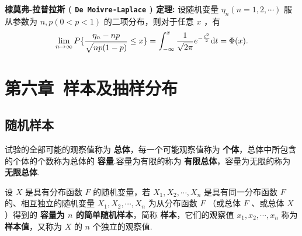 \documentclass[UTF8,10pt]{ctexart}
\begin{document}
	
	\textbf{棣莫弗-拉普拉斯 ( \texttt{De Moivre-Laplace} ) 定理:} 设随机变量 $ \eta _{n}(n=1,2, \cdots ) $ 服从参数为 $ n,p(0<p<1) $ 的二项分布，则对于任意 $ x $ ，有 $$ \lim\limits_{n \to \infty } P\{ \frac{ \eta _{n}-np}{ \sqrt{np(1-p)} } \le x \}= \int_{- \infty }^{x} \frac{1}{ \sqrt{2 \pi } } e^{- \frac{t^{2}}{2} }{\rm d}t= \Phi(x). $$
	
	\section{第六章\ 样本及抽样分布}
	
	\subsection{随机样本}
	
	试验的全部可能的观察值称为 \textbf{总体}，每一个可能观察值称为 \textbf{个体}，总体中所包含的个体的个数称为总体的 \textbf{容量}.容量为有限的称为 \textbf{有限总体}，容量为无限的称为 \textbf{无限总体}.
	
	设 $ X $ 是具有分布函数 $ F $ 的随机变量，若 $ X_{1},X_{2}, \cdots ,X_{n} $ 是具有同一分布函数 $ F $ 的、相互独立的随机变量 $ X_{1},X_{2}, \cdots ,X_{n} $ 为从分布函数 $ F $ （或总体 $ F $ 、或总体 $ X $ ）得到的 \textbf{容量为 $ n $ 的简单随机样本}，简称 \textbf{样本}，它们的观察值 $ x_{1},x_{2}, \cdots ,x_{n} $ 称为 \textbf{样本值}，又称为 $ X $ 的 $ n $ 个独立的观察值.
	
\end{document}
